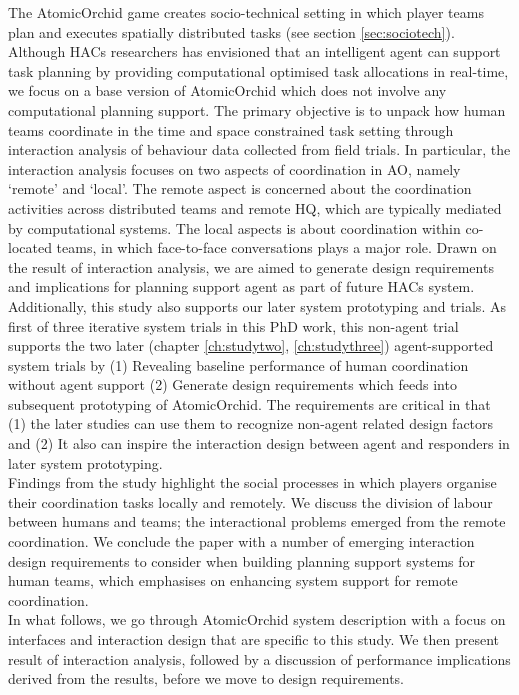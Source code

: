 The AtomicOrchid game creates socio-technical setting in which player teams plan and executes spatially distributed tasks (see section \ref{sec:sociotech}). Although HACs researchers has envisioned that an intelligent agent can support task planning by providing computational optimised task allocations in real-time, we focus on a base version of AtomicOrchid which does not involve any computational planning support. The primary objective is to unpack how human teams coordinate in the time and space constrained task setting through interaction analysis of behaviour data collected from field trials. In particular, the interaction analysis focuses on two aspects of coordination in AO, namely `remote' and `local'. The remote aspect is concerned about the coordination activities across distributed teams and remote HQ, which are typically mediated by computational systems. The local aspects is about coordination within co-located teams, in which face-to-face conversations plays a major role. Drawn on the result of interaction analysis, we are aimed to generate design requirements and implications for planning support agent as part of future HACs system.      \\

Additionally, this study also supports our later system prototyping and trials. As first of three iterative system trials in this PhD work, this non-agent trial supports the two later (chapter \ref{ch:studytwo}, \ref{ch:studythree}) agent-supported system trials by (1) Revealing baseline performance of human coordination without agent support (2) Generate design requirements which feeds into subsequent prototyping of AtomicOrchid. The requirements are critical in that (1) the later studies can use them to recognize non-agent related design factors and (2) It also can inspire the interaction design between agent and responders in later system prototyping.  \\

Findings from the study highlight the social processes in which players organise their coordination tasks locally and remotely. We discuss the division of labour between humans and teams; the interactional problems emerged from the remote coordination. We conclude the paper with a number of emerging interaction design requirements to consider when building planning support systems for human teams, which emphasises on enhancing system support for remote coordination. \\

In what follows, we go through AtomicOrchid system description with a focus on interfaces and interaction design that are specific to this study. We then present result of interaction analysis, followed by a discussion of performance implications derived from the results, before we move to design requirements.  \\

